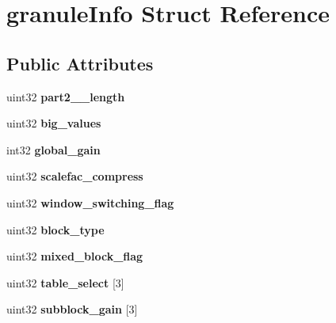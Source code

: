 \hypertarget{structgranuleInfo}{}\section{granule\+Info Struct Reference}
\label{structgranuleInfo}
\subsection*{Public Attributes}
\begin{DoxyCompactItemize}
\item 
\mbox{\label{structgranuleInfo_a30a6bd1ae8c1328997e2fff274fe0248}} 
uint32 {\bfseries part2\+\_\+\_\+length}
\item 
\mbox{\label{structgranuleInfo_a833894a700523854528c9d57f5319038}} 
uint32 {\bfseries big\+\_\+values}
\item 
\mbox{\label{structgranuleInfo_ab3647c3165c308aa0c49a57433f325a9}} 
int32 {\bfseries global\+\_\+gain}
\item 
\mbox{\label{structgranuleInfo_a8e7be2dc47f5b0daf67f95507559ee05}} 
uint32 {\bfseries scalefac\+\_\+compress}
\item 
\mbox{\label{structgranuleInfo_a41e4d2cdd4a780f3beb5a92465f2a735}} 
uint32 {\bfseries window\+\_\+switching\+\_\+flag}
\item 
\mbox{\label{structgranuleInfo_a5e524d4898aac64d44e5ae3cc4e2c6f3}} 
uint32 {\bfseries block\+\_\+type}
\item 
\mbox{\label{structgranuleInfo_ac72685b0a68cfaa60a98859ae5b49be9}} 
uint32 {\bfseries mixed\+\_\+block\+\_\+flag}
\item 
\mbox{\label{structgranuleInfo_a912feec4922c9ab17aa5c714de7af407}} 
uint32 {\bfseries table\+\_\+select} \mbox{[}3\mbox{]}
\item 
\mbox{\label{structgranuleInfo_a8f175d40d422fea002a516718d9f0287}} 
uint32 {\bfseries subblock\+\_\+gain} \mbox{[}3\mbox{]}
\item 

\end{DoxyCompactItemize}
